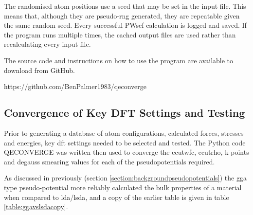 The randomised atom positions use a seed that may be set in the input file.  This means that, although they are pseudo-rng generated, they are repeatable given the same random seed.  Every successful PWscf calculation is logged and saved.  If the program runs multiple times, the cached output files are used rather than recalculating every input file.

The source code and instructions on how to use the program are available to download from GitHub.

https://github.com/BenPalmer1983/qeconverge












\FloatBarrier
\subsection[DFT Parameter Convergence]{Convergence of Key DFT Settings and Testing}

Prior to generating a database of atom configurations, calculated forces, stresses and energies, key \acrshort{dft} settings needed to be selected and tested.  The Python code QECONVERGE was written then used to converge the ecutwfc, ecutrho, k-points and degauss smearing values for each of the pseudopotentials required.
  
As discussed in previously (section \ref{section:backgroundpseudopotentials}) the \acrshort{gga} type pseudo-potential more reliably calculated the bulk properties of a material when compared to \acrshort{lda}/\acrshort{lsda}, and a copy of the earlier table is given in table \ref{table:ggavslsdacopy}.

